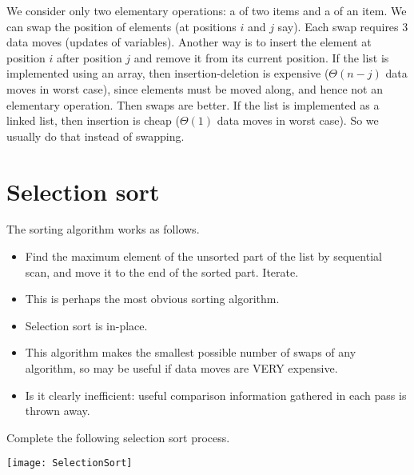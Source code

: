 
We consider only two elementary operations: a  of two items and a  of an item.
We can swap the position of elements (at positions $i$ and $j$ say). 
Each swap requires 3 data moves (updates of variables).
Another way is to insert the element at position $i$ after position $j$ and remove it from its current position.
If the list is implemented using an array, then insertion-deletion is expensive ($\Theta(n-j)$ data moves in worst case), 
since elements must be moved along, and hence not an elementary operation. Then swaps are better.
If the list is implemented as a linked list, then insertion is cheap ($\Theta(1)$ data moves in worst case).
So we usually do that instead of swapping.
	
\section{Selection sort} %
\label{sec:selectionsort}
The sorting algorithm  works as follows.
\begin{itemize} 
	\item Find the maximum element of the unsorted part of the list by sequential 
	scan, and move it to the end of the sorted part. Iterate.
	\item This is perhaps the most obvious sorting algorithm.
	\item Selection sort is in-place.
	\item This algorithm makes the smallest possible number of swaps of any algorithm, 
	so may be useful if data moves are VERY expensive.
	\item Is it clearly inefficient: useful comparison information gathered in each 
	pass is thrown away.
\end{itemize}

\begin{Boxample}[0]
Complete the following selection sort process.
\begin{center}
\texttt{[image: SelectionSort]}
\end{center}
\end{Boxample}


